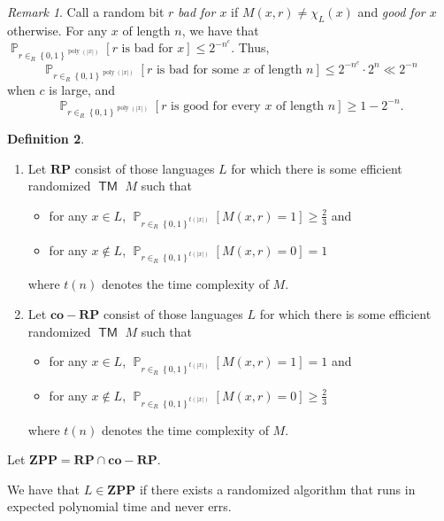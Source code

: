 \documentclass[10pt,letterpaper,cm]{nupset}
\theoremstyle{definition}
\newtheorem{definition}{Definition}[subsection]
\theoremstyle{theorem}
\theoremstyle{remark}
\newtheorem{remark}[definition]{Remark}
\newcommand{\1}{\mathbf{1}}
\newcommand{\0}{\vec 0}
\DeclareMathOperator{\pr}{\mathbb{P}}
\DeclareMathOperator{\TM}{\mathsf{TM}}
\DeclareMathOperator{\poly}{poly}
\begin{document}
\begin{remark}\label{good}
Call a random bit $r$ \textit{bad for $x$} if $M(x, r) \ne \chi_L(x)$ and \textit{good for $x$} otherwise. For any $x$ of length $n$, we have that  $\pr_{r\in_R \left\{0,1\right\}^{\poly(\left\lvert{x}\right\rvert)}}\left[r \text{ is bad for }x\right] \leq 2^{{-}n^c}$. Thus, $$\pr_{r\in_R \left\{0,1\right\}^{\poly(\left\lvert{x}\right\rvert)}}\left[r \text{ is bad for some }x \text{ of length }n\right] \leq 2^{{-}n^c}\cdot 2^n \ll 2^{{-}n}$$ when $c$ is large, and $$\pr_{r\in_R \left\{0,1\right\}^{\poly(\left\lvert{x}\right\rvert)}}\left[r \text{ is good for every }x \text{ of length }n\right] \geq 1 - 2^{{-}n}.$$
\end{remark}



\begin{definition} $ $
\begin{enumerate}
\item Let $\mathbf{RP}$ consist of those languages $L$ for which there is some efficient randomized $\TM$ $M$ such that 
\begin{itemize}
\item for any $x\in L$, $\pr_{r\in_R \left\{0,1\right\}^{t(\left\lvert{x}\right\rvert)}}\left[M(x,r)=1\right] \geq \frac{2}{3}$ and
\item for any $x\notin L$, $\pr_{r\in_R \left\{0,1\right\}^{t(\left\lvert{x}\right\rvert)}}\left[M(x,r)=0\right] = 1$
\end{itemize} where $t(n)$ denotes the time complexity of $M$.
\item Let $\mathbf{co{-}RP}$ consist of those languages $L$ for which there is some efficient randomized $\TM$ $M$ such that 
\begin{itemize}
\item for any $x\in L$, $\pr_{r\in_R \left\{0,1\right\}^{t(\left\lvert{x}\right\rvert)}}\left[M(x,r)=1\right]= 1$ and
\item for any $x\notin L$, $\pr_{r\in_R \left\{0,1\right\}^{t(\left\lvert{x}\right\rvert)}}\left[M(x,r)=0\right] \geq \frac{2}{3}$
\end{itemize} where $t(n)$ denotes the time complexity of $M$.
\end{enumerate}
Let $\mathbf{ZPP} = \mathbf{RP} \cap \mathbf{co{-}RP}$.
\end{definition}

\smallskip


We have that $L \in \mathbf{ZPP}$ if there exists a randomized algorithm that runs in expected polynomial time and never errs. 
\end{document}
